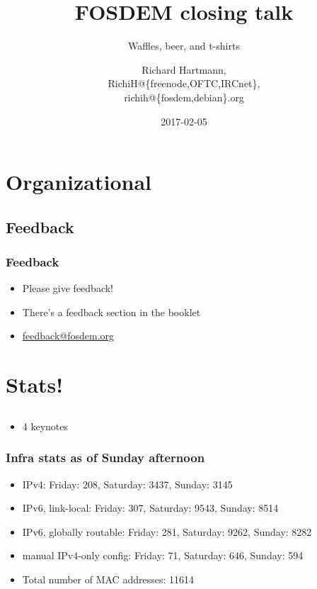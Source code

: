 \documentclass[t]{beamer}
\title{FOSDEM closing talk}
\subtitle{Waffles, beer, and t-shirts}
\author{Richard Hartmann,\\
RichiH@\{freenode,OFTC,IRCnet\},\\
richih@\{fosdem,debian\}.org}
\date{2017-02-05}
\begin{document}
\setcounter{tocdepth}{1}

\begin{frame}
	\titlepage
\end{frame}





\section{Organizational}

\subsection{Feedback}

\begin{frame}
	\frametitle{Feedback}
	\vfill
	\begin{itemize}
		\item Please give feedback!
		\item There's a feedback section in the booklet
		\item \url{feedback@fosdem.org}
	\end{itemize}
	\vfill
\end{frame}


\section{Stats!}

\subsection{}

\begin{frame}
	\frametitle{}
	\vfill
	\begin{itemize}
		\item 4 keynotes
	\end{itemize}
	\vfill
\end{frame}

\begin{frame}
	\frametitle{Infra stats as of Sunday afternoon}
	\vfill
	\begin{itemize}
		\item IPv4: Friday: 208, Saturday: 3437, Sunday: 3145
		\item IPv6, link-local: Friday: 307, Saturday: 9543, Sunday: 8514
		\item IPv6, globally routable: Friday: 281, Saturday: 9262, Sunday: 8282
		\item manual IPv4-only config: Friday: 71, Saturday: 646, Sunday: 594
		\item Total number of MAC addresses: 11614
	\end{itemize}
	\vfill
\end{frame}
\end{document}
